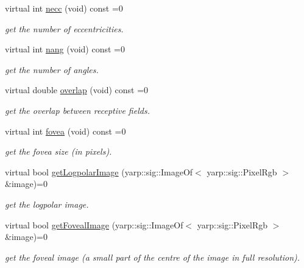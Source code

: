 \begin{DoxyCompactItemize}
\item 
virtual int \hyperlink{classyarp_1_1dev_1_1ILogpolarFrameGrabberImage_a4adb5af9e66c11d5ac044ac3cda8d27a}{necc} (void) const =0
\begin{DoxyCompactList}\small\item\em get the number of eccentricities. \end{DoxyCompactList}\item 
virtual int \hyperlink{classyarp_1_1dev_1_1ILogpolarFrameGrabberImage_a5ed45249a89ab14317711f3a7b805805}{nang} (void) const =0
\begin{DoxyCompactList}\small\item\em get the number of angles. \end{DoxyCompactList}\item 
virtual double \hyperlink{classyarp_1_1dev_1_1ILogpolarFrameGrabberImage_a5d11be9916d9d4bdddd0c6f44f066de8}{overlap} (void) const =0
\begin{DoxyCompactList}\small\item\em get the overlap between receptive fields. \end{DoxyCompactList}\item 
virtual int \hyperlink{classyarp_1_1dev_1_1ILogpolarFrameGrabberImage_a45024b93bf7734166f69b65f997379ac}{fovea} (void) const =0
\begin{DoxyCompactList}\small\item\em get the fovea size (in pixels). \end{DoxyCompactList}\item 
virtual bool \hyperlink{classyarp_1_1dev_1_1ILogpolarFrameGrabberImage_a8c95330ca7dfdea6b5abf8e3d8c238d8}{get\+Logpolar\+Image} (yarp\+::sig\+::\+Image\+Of$<$ yarp\+::sig\+::\+Pixel\+Rgb $>$ \&image)=0
\begin{DoxyCompactList}\small\item\em get the logpolar image. \end{DoxyCompactList}\item 
virtual bool \hyperlink{classyarp_1_1dev_1_1ILogpolarFrameGrabberImage_a981721bc337b26a92d4ae3c96024de0d}{get\+Foveal\+Image} (yarp\+::sig\+::\+Image\+Of$<$ yarp\+::sig\+::\+Pixel\+Rgb $>$ \&image)=0
\begin{DoxyCompactList}\small\item\em get the foveal image (a small part of the centre of the image in full resolution). \end{DoxyCompactList}\end{DoxyCompactItemize}


